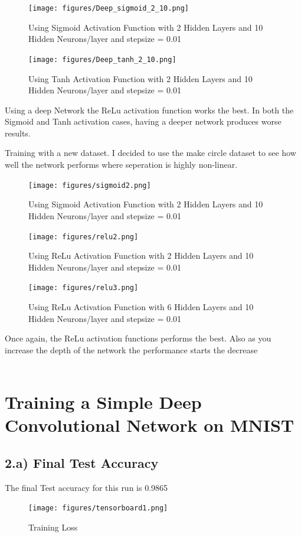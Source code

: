 \documentclass{article}
\begin{document}
	\begin{figure}[H]
		\centering
		\texttt{[image: figures/Deep\_sigmoid\_2\_10.png]}
		\caption{Using Sigmoid Activation Function with 2 Hidden Layers and 10 Hidden Neurons/layer and stepsize = 0.01}
	\end{figure}

	\begin{figure}[H]
		\centering
		\texttt{[image: figures/Deep\_tanh\_2\_10.png]}
		\caption{Using Tanh Activation Function with 2 Hidden Layers and 10 Hidden Neurons/layer and stepsize = 0.01}
	\end{figure}
Using a deep Network the ReLu activation function works the best. In both the Sigmoid and Tanh activation cases, having a deeper network produces worse results.

Training with a new dataset. I decided to use the make circle dataset to see how well the network performs where seperation is highly non-linear.

	\begin{figure}[H]
		\centering
		\texttt{[image: figures/sigmoid2.png]}
		\caption{Using Sigmoid Activation Function with 2 Hidden Layers and 10 Hidden Neurons/layer and stepsize = 0.01}
	\end{figure}

	\begin{figure}[H]
		\centering
		\texttt{[image: figures/relu2.png]}
		\caption{Using ReLu Activation Function with 2 Hidden Layers and 10 Hidden Neurons/layer and stepsize = 0.01}
	\end{figure}


	\begin{figure}[H]
		\centering
		\texttt{[image: figures/relu3.png]}
		\caption{Using ReLu Activation Function with 6 Hidden Layers and 10 Hidden Neurons/layer and stepsize = 0.01}
	\end{figure}

Once again, the ReLu activation functions performs the best. Also as you increase the depth of the network the performance starts the decrease\\\\

\section*{Training a Simple Deep Convolutional Network on MNIST}
\subsection*{2.a) Final Test Accuracy}
The final Test accuracy for this run is 0.9865
	\begin{figure}[H]
		\centering
		\texttt{[image: figures/tensorboard1.png]}
		\caption{Training Loss}
	\end{figure}
\end{document}
